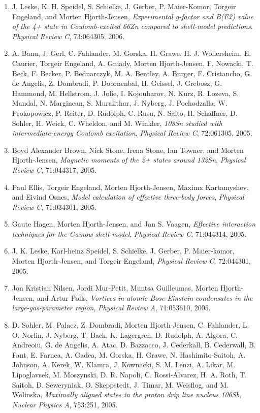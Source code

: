 \documentclass[%
oneside,                 %
final,                   %
10pt]{article}
\begin{document}
\begin{enumerate}
\item J. Leske, K. H. Speidel, S. Schielke, J. Gerber, P. Maier-Komor, Torgeir   Engeland, and Morten Hjorth-Jensen,  \emph{Experimental g-factor and B(E2) value of the 4+ state in Coulomb-excited 66Zn compared to shell-model predictions}.  \emph{Physical Review C}, 73:064305, 2006.   

\item A. Banu, J. Gerl, C. Fahlander, M. Gorska, H. Grawe, H. J. Wollersheim,   E. Caurier, Torgeir Engeland, A. Gniady, Morten Hjorth-Jensen, F. Nowacki,   T. Beck, F. Becker, P. Bednarczyk, M. A. Bentley, A. Burger, F. Cristancho,   G. de Angelis, Z. Dombradi, P. Doornenbal, H. Geissel, J. Grebosz,   G. Hammond, M. Hellstrom, J. Jolie, I. Kojouharov, N. Kurz, R. Lozeva,   S. Mandal, N. Marginean, S. Muralithar, J. Nyberg, J. Pochodzalla,   W. Prokopowicz, P. Reiter, D. Rudolph, C. Rusu, N. Saito, H. Schaffner,   D. Sohler, H. Weick, C. Wheldon, and M. Winkler,  \emph{108Sn studied with intermediate-energy Coulomb excitation},  \emph{Physical Review C}, 72:061305, 2005. 

\item Boyd Alexander Brown, Nick Stone, Irena Stone, Ian Towner, and Morten Hjorth-Jensen,  \emph{Magnetic moments of the 2+ states around 132Sn},  \emph{Physical Review C}, 71:044317, 2005. 

\item Paul Ellis, Torgeir Engeland, Morten Hjorth-Jensen, Maximx Kartamyshev, and   Eivind Osnes, \emph{Model calculation of effective three-body forces},   \emph{Physical Review C}, 71:034301, 2005. 

\item Gaute Hagen, Morten Hjorth-Jensen, and Jan S. Vaagen, \emph{Effective interaction techniques for the Gamow shell model},  \emph{Physical Review C}, 71:044314, 2005. 

\item J. K. Leske, Karl-heinz Speidel, S. Schielke, J. Gerber, P. Maier-komor, Morten   Hjorth-Jensen, and Torgeir Engeland,  \emph{Physical Review C}, 72:044301, 2005. 

\item Jon Kristian Nilsen, Jordi Mur-Petit, Muntsa Guilleumas, Morten Hjorth-Jensen,   and Artur Polls,  \emph{Vortices in atomic Bose-Einstein condensates in the  large-gas-parameter region},  \emph{Physical Review A}, 71:053610, 2005. 

\item D. Sohler, M. Palacz, Z. Dombradi, Morten Hjorth-Jensen, C. Fahlander, L. O.   Norlin, J. Nyberg, T. Back, K. Lagergren, D. Rudolph, A. Algora, C. Andreoiu,   G. de Angelis, A. Atac, D. Bazzacco, J. Cederkall, B. Cederwall, B. Fant,   E. Farnea, A. Gadea, M. Gorska, H. Grawe, N. Hashimito-Saitoh, A. Johnson,   A. Kerek, W. Klamra, J. Kownacki, S. M. Lenzi, A. Likar, M. Lipoglavsek,   M. Moszynski, D. R. Napoli, C. Rossi-Alvarez, H. A. Roth, T. Saitoh,   D. Seweryniak, O. Skeppstedt, J. Timar, M. Weisflog, and M. Wolinska, \emph{Maximally aligned states in the proton drip line nucleus 106Sb},  \emph{Nuclear Physics A}, 753:251, 2005. 


\end{enumerate}
\end{document}
